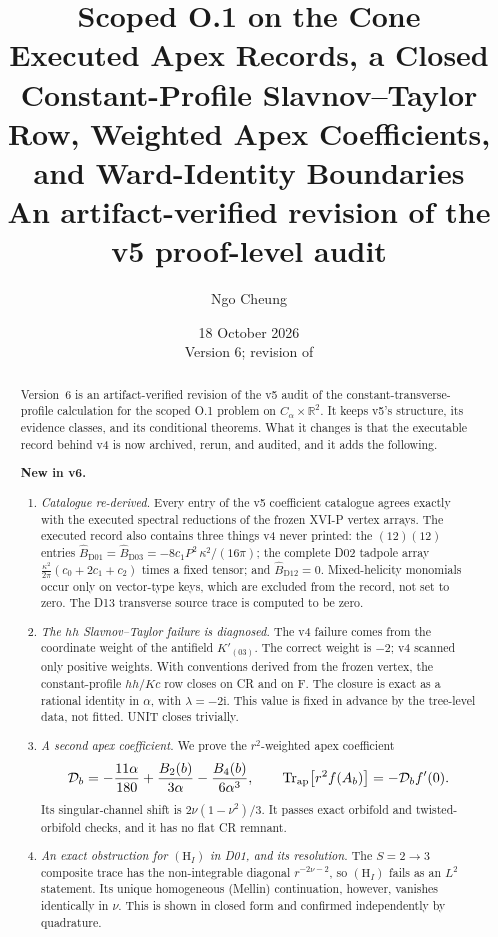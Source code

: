\documentclass[11pt,a4paper]{article}
\title{\textbf{Scoped O.1 on the Cone}\\[5pt]
\Large Executed Apex Records, a Closed Constant-Profile
Slavnov--Taylor Row, Weighted Apex Coefficients,
and Ward-Identity Boundaries\\[6pt]
\large An artifact-verified revision of the v5 proof-level audit}
\author{Ngo Cheung}
\date{18 October 2026\\
\small Version 6; revision of \loc{XVI-O1-CONE-v5.tex}}
\newcommand{\RR}{\mathbb R}
\newcommand{\ka}{\kappa}
\newcommand{\ii}{\mathrm i}
\newcommand{\HI}{(\mathrm H_I)}
\newcommand{\ApTr}{\operatorname{Tr}_{\rm ap}}
\theoremstyle{plain}
\theoremstyle{definition}
\theoremstyle{remark}
\numberwithin{equation}{section}
\begin{document}
\maketitle

\begin{abstract}
Version~6 is an artifact-verified revision of the v5 audit of the
constant-transverse-profile calculation for the scoped O.1 problem
on \(C_\alpha\times\RR^2\).
It keeps v5's structure, its evidence classes, and its conditional
theorems. What it changes is that the executable record behind v4
is now archived, rerun, and audited, and it adds the following.

\smallskip\noindent\textbf{New in v6.}
\begin{enumerate}[label=\textup{(\arabic*)},leftmargin=1.6em]
\item \emph{Catalogue re-derived.}
Every entry of the v5 coefficient catalogue agrees exactly with the
executed spectral reductions of the frozen XVI-P vertex arrays.
The executed record also contains three things v4 never printed:
the \((12)(12)\) entries
\(\widehat B_{\mathrm{D01}}=\widehat B_{\mathrm{D03}}
=-8c_1P^2\,\ka^2/(16\pi)\); the complete D02 tadpole array
\(\tfrac{\ka^2}{2\pi}(c_0+2c_1+c_2)\) times a fixed tensor;
and \(\widehat B_{\mathrm{D12}}=0\).
Mixed-helicity monomials occur only on vector-type keys, which are
excluded from the record, not set to zero.
The D13 transverse source trace is computed to be zero.

\item \emph{The \(hh\) Slavnov--Taylor failure is diagnosed.}
The v4 failure comes from the coordinate weight of the antifield
\(K'_{(03)}\). The correct weight is \(-2\); v4 scanned only
positive weights.
With conventions derived from the frozen vertex, the
constant-profile \(hh/Kc\) row closes on CR and on F.
The closure is exact as a rational identity in \(\alpha\), with
\(\lambda=-2\ii\). This value is fixed in advance by the tree-level
data, not fitted. UNIT closes trivially.

\item \emph{A second apex coefficient.}
We prove the \(r^2\)-weighted apex coefficient
\[
\mathcal D_b=-\frac{11\alpha}{180}+\frac{B_2(b)}{3\alpha}
-\frac{B_4(b)}{6\alpha^3},
\qquad
\ApTr\bigl[r^2f(A_b)\bigr]=-\mathcal D_bf'(0).
\]
Its singular-channel shift is \(2\nu(1-\nu^2)/3\).
It passes exact orbifold and twisted-orbifold checks, and it has no
flat CR remnant.

\item \emph{An exact obstruction for \(\HI\) in D01, and its
resolution.}
The \(S=2\to3\) composite trace has the non-integrable diagonal
\(r^{-2\nu-2}\), so \(\HI\) fails as an \(L^2\) statement.
Its unique homogeneous (Mellin) continuation, however, vanishes
identically in \(\nu\). This is shown in closed form and confirmed
independently by quadrature.


\end{enumerate}
\end{abstract}
\end{document}
